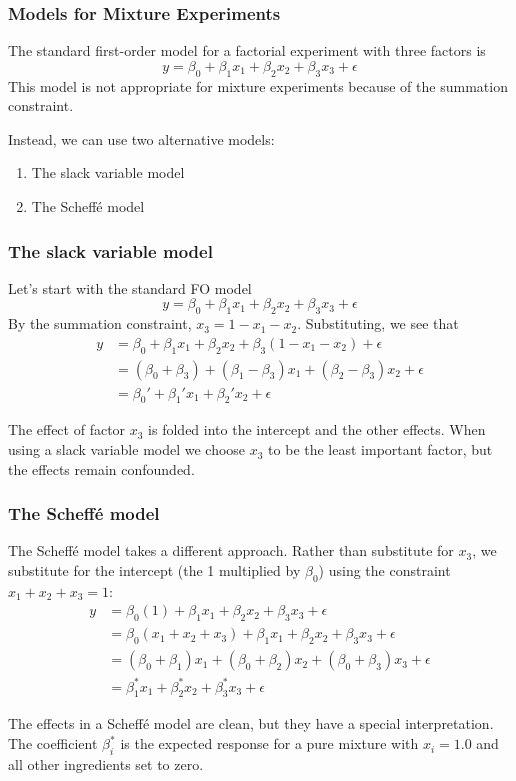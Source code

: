 \documentclass{beamer}
\begin{document}
\begin{frame}
\frametitle{Models for Mixture Experiments}

The standard first-order model for a factorial experiment with three factors is
\[ y = \beta_0 + \beta_1x_1 + \beta_2x_2 + \beta_3x_3 + \epsilon \]
This model is not appropriate for mixture experiments because of the summation constraint.

\medskip
Instead, we can use two alternative models:
\begin{enumerate}
	\item The slack variable model
	\item The Scheff\'{e} model
\end{enumerate}

\end{frame}

\begin{frame}
\frametitle{The slack variable model}	

Let's start with the standard FO model
\[ y = \beta_0 + \beta_1x_1 + \beta_2x_2 + \beta_3x_3 + \epsilon \]
By the summation constraint, $x_3 = 1 - x_1 - x_2$. Substituting, we see that
\begin{align*}
 y &= \beta_0 + \beta_1x_1 + \beta_2x_2 + \beta_3(1 - x_1 - x_2) + \epsilon \\
  &= (\beta_0 + \beta_3) + (\beta_1 - \beta_3)x_1 + (\beta_2 - \beta_3)x_2 + \epsilon \\
  &= \beta_0' + \beta_1'x_1 + \beta_2'x_2 + \epsilon
\end{align*}

\pause
The effect of factor $x_3$ is folded into the intercept and the other effects. When using a slack variable model we choose $x_3$ to be the least important factor, but the effects remain confounded.
\end{frame}

\begin{frame}
\frametitle{The Scheff\'{e} model}

The Scheff\'{e} model takes a different approach. Rather than substitute for $x_3$, we substitute for the intercept (the 1 multiplied by $\beta_0$) using the constraint $x_1 + x_2 + x_3 = 1$:
\begin{align*}
 y &= \beta_0(1) + \beta_1x_1 + \beta_2x_2 + \beta_3x_3 + \epsilon \\
  &= \beta_0(x_1+x_2+x_3) + \beta_1x_1 + \beta_2x_2 + \beta_3x_3 + \epsilon \\
  &= (\beta_0 + \beta_1)x_1 + (\beta_0 + \beta_2)x_2 + (\beta_0 + \beta_3)x_3 + \epsilon \\
  &= \beta_1^*x_1 + \beta_2^*x_2 + \beta_3^*x_3 + \epsilon
\end{align*}

\pause
The effects in a Scheff\'{e} model are clean, but they have a special interpretation. The coefficient $\beta_i^*$ is the expected response for a pure mixture with $x_i=1.0$ and all other ingredients set to zero.
\end{frame}
\end{document}
